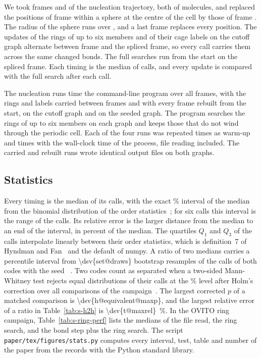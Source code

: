 \documentclass[preprint,12pt]{elsarticle}
\begin{document}
We took frames  and  of the nucleation
trajectory, both of  molecules, and replaced the positions of
frame  within a sphere at the centre of the cell by
those of frame .
The radius of the sphere runs over , and a last frame
replaces every position.
The updates of the rings of up to six members and of their cage labels
on the cutoff graph alternate between frame  and the
spliced frame, so every call carries them across the same changed bonds.
The full searches run from the start on the spliced frame.
Each timing is the median of  calls, and every update is
compared with the full search after each call.

The nucleation runs time the command-line program over all
 frames, with the rings and labels carried between frames
and with every frame rebuilt from the start, on the cutoff graph and on
the seeded graph.
The program searches the rings of up to six members on each graph and
keeps those that do not wind through the periodic cell.
Each of the four runs was repeated  times as
warm-up and  times with the wall-clock time of the
process, file reading included.
The carried and rebuilt runs wrote identical output files on both
graphs.

\subsection{Statistics}
\label{sec:s-stats}

Every timing is the median of its calls, with the exact
\% interval of the median from the binomial
distribution of the order statistics~\cite{hollander2014nonparametric};
for six calls this interval is the range of the calls.
Its relative error is the larger distance from the median to an end of
the interval, in percent of the median.
The quartiles $Q_1$ and $Q_3$ of the calls interpolate linearly between
their order statistics, which is definition~7 of Hyndman and
Fan~\cite{hyndman1996sample} and the default of numpy.
A ratio of two medians carries a percentile interval from
\num{\dsv{set@draws}} bootstrap resamples of the calls of both codes
with the seed ~\cite{efron1993bootstrap}.
Two codes count as separated when a two-sided Mann-Whitney test rejects
equal distributions of their calls at the \%
level after Holm's correction over all  comparisons
of the campaign~\cite{holm1979simple}.
The largest corrected $p$ of a matched comparison is
\num{\dsv{h@equivalent@maxp}}, and the largest relative error of a ratio
in Table~\ref{tab:s-h2h} is \qty{\dsv{t@maxrel}}{\percent}.
In the OVITO ring campaign, Table~\ref{tab:s-ring-perf} lists the
medians of the file read, the ring search, and the bond step plus the
ring search.
The script \texttt{paper/tex/figures/stats.py} computes every interval,
test, table and number of the paper from the records with the Python
standard library.
\end{document}
